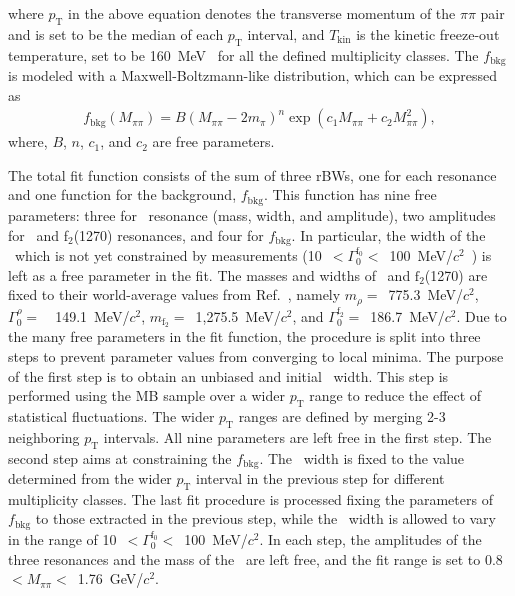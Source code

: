 where $p_{\mathrm{T}}$ in the above equation denotes the transverse momentum of the $\pi\pi$ pair and is set to be the median of each $p_{\mathrm{T}}$ interval, and $T_{\mathrm{kin}}$ is the kinetic freeze-out temperature, set to be 160~MeV~\cite{ALICE:2018qdv} for all the defined multiplicity classes. The $f_{\mathrm{bkg}}$ is modeled with a Maxwell-Boltzmann-like distribution, which can be expressed as~\cite{OPAL:1998enc}
\begin{eqnarray}
f_{\mathrm{bkg}}(M_{\pi\pi}) = B(M_{\pi\pi}-2m_{\pi})^{n}\exp{(c_{1}M_{\pi\pi} + c_{2}M_{\pi\pi}^{2})},
\label{eq:bkg}
\end{eqnarray} 
where, $B$, $n$, $c_{1}$, and $c_{2}$ are free parameters. 

The total fit function consists of the sum of three rBWs, one for each resonance and one function for the background, $f_{\mathrm{bkg}}$. This function has nine free parameters: three for \fzero~resonance (mass, width, and amplitude), two amplitudes for \rhoz~and f$_{2}$(1270) resonances, and four for $f_{\mathrm{bkg}}$. In particular, the width of the \fzero~which is not yet constrained by measurements (10~$<\Gamma_{0}^{\mathrm{f}_{0}}<$~100~MeV/$c^{2}$~\cite{ParticleDataGroup:2022pth}) is left as a free parameter in the fit. The masses and widths of \rhoz~and $\mathrm{f}_{2}$(1270) are fixed to their world-average values from Ref.~\cite{ParticleDataGroup:2022pth}, namely $m_{\rho}=$~775.3~MeV/$c^{2}$, $\Gamma^{\rho}_{0}=$~~149.1~MeV/$c^{2}$, $m_{\mathrm{f}_{2}}=$~1,275.5~MeV/$c^{2}$, and $\Gamma^{\mathrm{f}_{2}}_{0}=$~186.7~MeV/$c^{2}$. Due to the many free parameters in the fit function, the procedure is split into three steps to prevent parameter values from converging to local minima. The purpose of the first step is to obtain an unbiased and initial \fzero~width. This step is performed using the MB sample over a wider $p_{\mathrm{T}}$ range to reduce the effect of statistical fluctuations. The wider $p_{\mathrm{T}}$ ranges are defined by merging 2-3 neighboring $p_{\mathrm{T}}$ intervals. All nine parameters are left free in the first step. The second step aims at constraining the $f_{\mathrm{bkg}}$. The \fzero~width is fixed to the value determined from the wider $p_{\mathrm{T}}$ interval in the previous step for different multiplicity classes. The last fit procedure is processed fixing the parameters of $f_{\mathrm{bkg}}$ to those extracted in the previous step, while the \fzero~width is allowed to vary in the range of 10~$<\Gamma_{0}^{\mathrm{f}_{0}}<$~100~MeV/$c^{2}$. In each step, the amplitudes of the three resonances and the mass of the \fzero~are left free, and the fit range is set to 0.8~$<M_{\pi\pi}<$~1.76~GeV/$c^{2}$.


